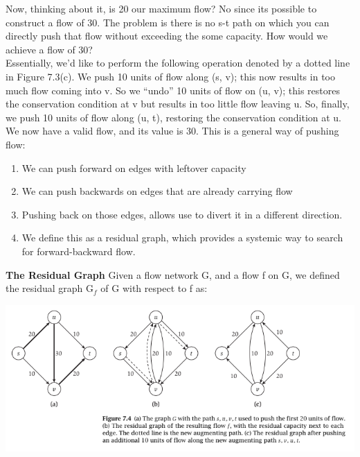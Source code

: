 \documentclass{article}
\begin{document}
Now, thinking about it, is 20 our maximum flow? No since its possible to construct a flow of 30. The problem is there is no s-t path on which you can directly push that flow without exceeding the some capacity. How would we achieve a flow of 30?\\

Essentially, we’d like to perform the following operation denoted by a dotted line in Figure 7.3(c). We push 10 units of flow along (s, v); this now results in too much flow coming into v. So we “undo” 10 units of flow on (u, v); this restores the conservation condition at v but results in too little flow leaving u. So, finally, we push 10 units of flow along (u, t), restoring the conservation condition at u. We now have a valid flow, and its value is 30. This is a general way of pushing flow:\\

\begin{enumerate}
    \item We can push forward on edges with leftover capacity
    \item We can push backwards on edges that are already carrying flow
    \item Pushing back on those edges, allows use to divert it in a different direction.
    \item We define this as a residual graph, which provides a systemic way to search for forward-backward flow.
\end{enumerate}

\textbf{The Residual Graph} Given a flow network G, and a flow f on G, we defined the residual graph G$_f$ of G with respect to f as:\\

\begin{center}
    \includegraphics[]{figures/fig22.png}
\end{center}
\end{document}
